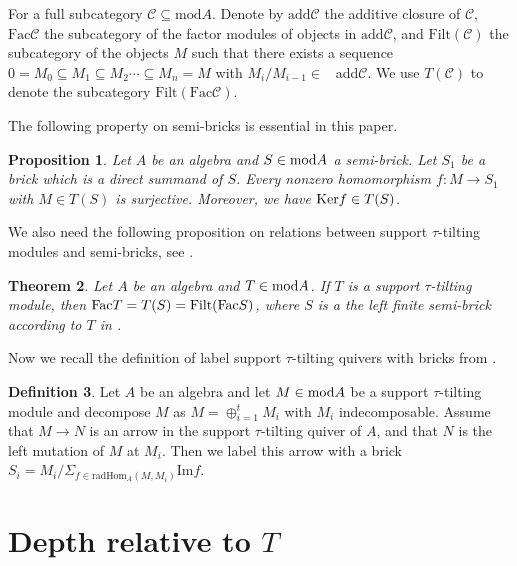 \documentclass[a4paper]{amsart}
\newtheorem{thm}{Theorem}[section]
\newtheorem{prop}[thm]{Proposition}
\theoremstyle{definition}
\newtheorem{defn}[thm]{Definition}
\theoremstyle{remark}
\numberwithin{equation}{section}
\begin{document}
 For a full  subcategory  $\mathcal{C}\subseteq \text{mod}A$. Denote by
$\text{add}\mathcal{C}$ the additive closure of $\mathcal{C}$,
 $\text{Fac}\mathcal{C}$ the subcategory of the factor modules of objects in $\text{add}\mathcal{C}$,
 and $\text{Filt}(\mathcal{C})$ the subcategory of the objects $M$ such that there exists a sequence
$0= M_0 \subseteq M_1 \subseteq M_2 \cdots  \subseteq M_n = M$ with  $M_i/M _{i-1} \in$ ~add$\mathcal{C}$.
We use $T(\mathcal{C})$ to denote the subcategory $\text{Filt}(\text{Fac}\mathcal{C})$.

The following property on semi-bricks \cite[Lemma 2.7(1)]{As} is essential in this paper.

\begin{prop}\label{2.8}
Let $A$ be an algebra and $S \in \textup{mod}A$ a semi-brick. Let $S_1$ be a brick which is a direct summand of $S$. Every nonzero homomorphism $f: M \to S_1$ with $M \in T(S)$ is surjective. Moreover, we have $\textup{Ker}f \in T(S)$.
\end{prop}

We also need the following proposition on relations between support $\tau$-tilting modules and semi-bricks, see \cite[Proposition 2.9(1), Theorem 2.3(2)]{As}.

\begin{thm}\label{2.9} Let $A$ be an algebra and $T\in\textup{mod}A$.
If $T$ is a support $\tau$-tilting module, then $ \textup{Fac}T = T(S)=\textup{Filt(Fac}S)$, where $S$ is a the left finite semi-brick according to $T$ in \cite[Theorem 2.3(2)]{As}.
\end{thm}

Now we recall the definition of label support $\tau$-tilting quivers with bricks from \cite[Definition 2.14]{As}.

\begin{defn}\label{2.11} Let $A$ be an algebra and let $M\in\textup{mod}A$ be a support $\tau$-tilting module and decompose $M$ as $M =\oplus_{i=1}^t M_i$
with $M_i$ indecomposable. Assume that $M \to N$ is an arrow in the support $\tau$-tilting quiver of $A$, and that
$N$ is the left mutation of $M$ at $M_i$. Then we label this arrow with a brick $S_i=M_i/\Sigma_{f\in \text{rad}\text{Hom}_A(M, M_i)}{\text{Im}f}$.
\end{defn}


\section{Depth relative to $T$}
\end{document}
